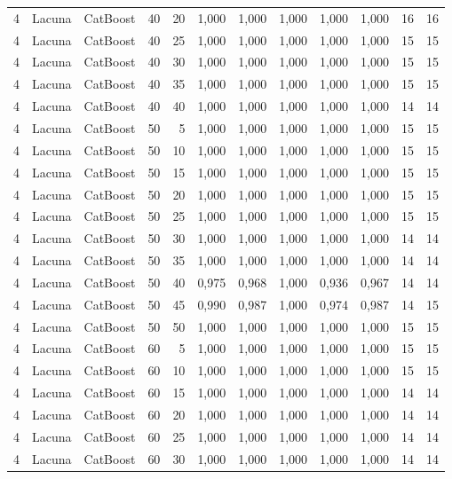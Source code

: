 \begin{longtable}{ccclrrrrrrrr}
4 & Lacuna & CatBoost & 40 & 20 & 1,000 & 1,000 & 1,000 & 1,000 & 1,000 & 16 & 16 \\
4 & Lacuna & CatBoost & 40 & 25 & 1,000 & 1,000 & 1,000 & 1,000 & 1,000 & 15 & 15 \\
4 & Lacuna & CatBoost & 40 & 30 & 1,000 & 1,000 & 1,000 & 1,000 & 1,000 & 15 & 15 \\
4 & Lacuna & CatBoost & 40 & 35 & 1,000 & 1,000 & 1,000 & 1,000 & 1,000 & 15 & 15 \\
4 & Lacuna & CatBoost & 40 & 40 & 1,000 & 1,000 & 1,000 & 1,000 & 1,000 & 14 & 14 \\
4 & Lacuna & CatBoost & 50 & 5 & 1,000 & 1,000 & 1,000 & 1,000 & 1,000 & 15 & 15 \\
4 & Lacuna & CatBoost & 50 & 10 & 1,000 & 1,000 & 1,000 & 1,000 & 1,000 & 15 & 15 \\
4 & Lacuna & CatBoost & 50 & 15 & 1,000 & 1,000 & 1,000 & 1,000 & 1,000 & 15 & 15 \\
4 & Lacuna & CatBoost & 50 & 20 & 1,000 & 1,000 & 1,000 & 1,000 & 1,000 & 15 & 15 \\
4 & Lacuna & CatBoost & 50 & 25 & 1,000 & 1,000 & 1,000 & 1,000 & 1,000 & 15 & 15 \\
4 & Lacuna & CatBoost & 50 & 30 & 1,000 & 1,000 & 1,000 & 1,000 & 1,000 & 14 & 14 \\
4 & Lacuna & CatBoost & 50 & 35 & 1,000 & 1,000 & 1,000 & 1,000 & 1,000 & 14 & 14 \\
4 & Lacuna & CatBoost & 50 & 40 & 0,975 & 0,968 & 1,000 & 0,936 & 0,967 & 14 & 14 \\
4 & Lacuna & CatBoost & 50 & 45 & 0,990 & 0,987 & 1,000 & 0,974 & 0,987 & 14 & 15 \\
4 & Lacuna & CatBoost & 50 & 50 & 1,000 & 1,000 & 1,000 & 1,000 & 1,000 & 15 & 15 \\
4 & Lacuna & CatBoost & 60 & 5 & 1,000 & 1,000 & 1,000 & 1,000 & 1,000 & 15 & 15 \\
4 & Lacuna & CatBoost & 60 & 10 & 1,000 & 1,000 & 1,000 & 1,000 & 1,000 & 15 & 15 \\
4 & Lacuna & CatBoost & 60 & 15 & 1,000 & 1,000 & 1,000 & 1,000 & 1,000 & 14 & 14 \\
4 & Lacuna & CatBoost & 60 & 20 & 1,000 & 1,000 & 1,000 & 1,000 & 1,000 & 14 & 14 \\
4 & Lacuna & CatBoost & 60 & 25 & 1,000 & 1,000 & 1,000 & 1,000 & 1,000 & 14 & 14 \\
4 & Lacuna & CatBoost & 60 & 30 & 1,000 & 1,000 & 1,000 & 1,000 & 1,000 & 14 & 14 \\

\end{longtable}
